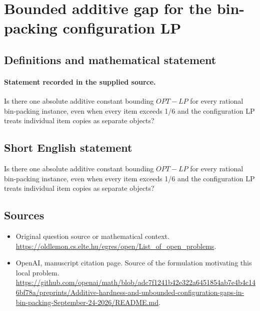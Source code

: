 \documentclass[11pt]{article}
\begin{document}
\section*{Bounded additive gap for the bin-packing configuration LP}\label{30007444}
\subsection{Definitions and mathematical statement}
\paragraph{Statement recorded in the supplied source.}
Is there one absolute additive constant bounding $OPT-LP$ for every rational bin-packing instance, even when every item exceeds 1/6 and the configuration LP treats individual item copies as separate objects?
\subsection{Short English statement}
Is there one absolute additive constant bounding $OPT-LP$ for every rational bin-packing instance, even when every item exceeds 1/6 and the configuration LP treats individual item copies as separate objects?
\subsection{Sources}
\begin{itemize}
\item[S1] Original question source or mathematical context.
\url{https://oldlemon.cs.elte.hu/egres/open/List_of_open_problems}.
\item[S2] OpenAI, manuscript citation page. Source of the formulation motivating this local problem.
\url{https://github.com/openai/math/blob/adc7f1241b42e322a6451854ab7e4b4c146bf78a/preprints/Additive-hardness-and-unbounded-configuration-gaps-in-bin-packing-September-24-2026/README.md}.
\end{itemize}
\end{document}
